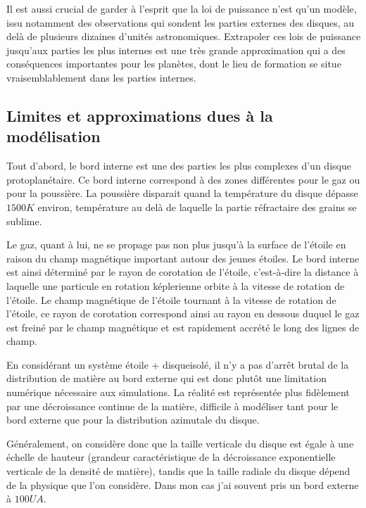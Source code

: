 Il est aussi crucial de garder à l'esprit que la loi de puissance n'est qu'un modèle, issu notamment des observations qui
sondent les parties externes des disques, au delà de plusieurs dizaines d'unités astronomiques. Extrapoler ces lois de puissance
jusqu'aux parties les plus internes est une très grande approximation qui a des conséquences importantes pour les planètes, dont
le lieu de formation se situe vraisemblablement dans les parties internes.

\subsection{Limites et approximations dues à la modélisation}
Tout d'abord, le bord interne est une des parties les plus complexes d'un disque protoplanétaire. Ce bord interne correspond à des zones différentes pour le gaz ou pour la poussière. La poussière disparait quand la température du disque dépasse $1500\unit{K}$ environ, température au delà de laquelle la partie réfractaire des grains se sublime. 

Le gaz, quant à lui, ne se propage pas non plus jusqu'à la surface de l'étoile en raison du champ magnétique important autour des jeunes étoiles. Le bord interne est ainsi déterminé par le rayon de corotation de l'étoile, c'est-à-dire la distance à laquelle une particule en rotation képlerienne orbite à la vitesse de rotation de l'étoile. Le champ magnétique de l'étoile tournant à la vitesse de rotation de l'étoile, ce rayon de corotation correspond ainsi au rayon en dessous duquel le gaz est freiné par le champ magnétique et est rapidement accrété le long des lignes de champ. 

\bigskip

En considérant un système \og étoile + disque\fg isolé, il n'y a pas d'arrêt brutal de la distribution de matière au bord externe qui est donc plutôt une limitation numérique nécessaire aux simulations. La réalité est représentée plus fidèlement par une décroissance continue de la matière, difficile à modéliser tant pour le bord externe que pour la distribution azimutale du disque. 

Généralement, on considère donc que la taille verticale du disque est égale à une échelle de hauteur (grandeur caractéristique de la décroissance exponentielle verticale de la densité de matière), tandis que la taille radiale du disque dépend de la physique que l'on considère. Dans mon cas j'ai souvent pris un bord externe à $100\unit{UA}$.

